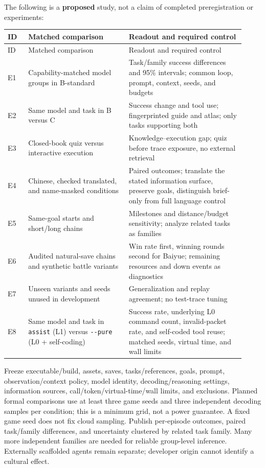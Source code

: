 \documentclass[11pt,a4paper]{article}
\begin{document}
The following is a \textbf{proposed} study, not a claim of completed preregistration or experiments:

{\small\setlength{\tabcolsep}{3pt}
\begin{longtable}{@{}>{\RaggedRight\arraybackslash}p{0.08\linewidth}>{\RaggedRight\arraybackslash}p{0.39\linewidth}>{\RaggedRight\arraybackslash}p{0.45\linewidth}@{}}
\toprule
ID & Matched comparison & Readout and required control \\
\midrule\endfirsthead
\toprule
ID & Matched comparison & Readout and required control \\
\midrule\endhead
\bottomrule\endfoot
E1 & Capability-matched model groups in B-standard & Task/family success differences and 95\% intervals; common loop, prompt, context, seeds, and budgets \\
E2 & Same model and task in B versus C & Success change and tool use; fingerprinted guide and atlas; only tasks supporting both \\
E3 & Closed-book quiz versus interactive execution & Knowledge--execution gap; quiz before trace exposure, no external retrieval \\
E4 & Chinese, checked translated, and name-masked conditions & Paired outcomes; translate the stated information surface, preserve goals, distinguish brief-only from full language control \\
E5 & Same-goal starts and short/long chains & Milestones and distance/budget sensitivity; analyze related tasks as families \\
E6 & Audited natural-save chains and synthetic battle variants & Win rate first, winning rounds second for Baiyue; remaining resources and down events as diagnostics \\
E7 & Unseen variants and seeds unused in development & Generalization and replay agreement; no test-trace tuning \\
E8 & Same model and task in \texttt{assist} (L1) versus \texttt{-\allowbreak{}-\allowbreak{}pure} (L0 + self-coding) & Success rate, underlying L0 command count, invalid-packet rate, and self-coded tool reuse; matched seeds, virtual time, and wall limits \\
\end{longtable}
}

Freeze executable/build, assets, saves, tasks/references, goals, prompt, observation/context policy, model identity, decoding/reasoning settings, information sources, call/token/virtual-time/wall limits, and exclusions. Planned formal comparisons use at least three game seeds and three independent decoding samples per condition; this is a minimum grid, not a power guarantee. A fixed game seed does not fix cloud sampling. Publish per-episode outcomes, paired task/family differences, and uncertainty clustered by related task family. Many more independent families are needed for reliable group-level inference. Externally scaffolded agents remain separate; developer origin cannot identify a cultural effect.
\end{document}
